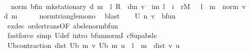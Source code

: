 \begin{isabellebody}
\ \ \isamarkupfalse%
\ \isamarkupfalse%
\ {\isacharasterisk}{\kern0pt}{\isacharcolon}{\kern0pt}\ {\isachardoublequoteopen}norm\ {\isacharparenleft}{\kern0pt}{\isasymnu}\isactrlsub b{\isacharunderscore}{\kern0pt}fin\ {\isacharparenleft}{\kern0pt}mk{\isacharunderscore}{\kern0pt}stationary\ d{\isacharparenright}{\kern0pt}\ m\ {\isacharplus}{\kern0pt}\ {\isacharparenleft}{\kern0pt}{\isacharparenleft}{\kern0pt}l\ {\isacharasterisk}{\kern0pt}\isactrlsub R\ {\isasymP}\ d{\isacharparenright}{\kern0pt}{\isacharcircum}{\kern0pt}{\isacharcircum}{\kern0pt}m{\isacharparenright}{\kern0pt}\ v{\isacharparenright}{\kern0pt}\ {\isasymle}\ {\isacharparenleft}{\kern0pt}{\isasymSum}i{\isacharless}{\kern0pt}m{\isachardot}{\kern0pt}\ l\ {\isacharcircum}{\kern0pt}\ i\ {\isacharasterisk}{\kern0pt}\ r\isactrlsub M{\isacharparenright}{\kern0pt}\ {\isacharplus}{\kern0pt}\ \ l\ {\isacharcircum}{\kern0pt}\ m\ {\isacharasterisk}{\kern0pt}\ norm\ v{\isachardoublequoteclose}\ \ d\ m\isanewline
\ \ \ \ \isamarkupfalse%
\ norm{\isacharunderscore}{\kern0pt}triangle{\isacharunderscore}{\kern0pt}mono\ \isamarkupfalse%
\ blast\isanewline
\ \ \isamarkupfalse%
\ {\isachardoublequoteopen}U\ n\ v\ {\isasymin}\ bfun{\isachardoublequoteclose}\isanewline
\ \ \ \ \isamarkupfalse%
\ ex{\isacharunderscore}{\kern0pt}dec\ order{\isachardot}{\kern0pt}trans{\isacharbrackleft}{\kern0pt}OF\ abs{\isacharunderscore}{\kern0pt}le{\isacharunderscore}{\kern0pt}norm{\isacharunderscore}{\kern0pt}bfun\ {\isacharasterisk}{\kern0pt}{\isacharbrackright}{\kern0pt}\isanewline
\ \ \ \ \isamarkupfalse%
\ {\isacharparenleft}{\kern0pt}fastforce\ simp{\isacharcolon}{\kern0pt}\ U{\isacharunderscore}{\kern0pt}def\ intro{\isacharbang}{\kern0pt}{\isacharcolon}{\kern0pt}\ bfun{\isacharunderscore}{\kern0pt}normI\ cSup{\isacharunderscore}{\kern0pt}abs{\isacharunderscore}{\kern0pt}le{\isacharparenright}{\kern0pt}\isanewline
{}\isamarkupfalse%
%
\endisatagproof
{\isafoldproof}%
%
\isadelimproof
\isanewline
%
\endisadelimproof
\isanewline
{}\isamarkupfalse%
\ U\isactrlsub b{\isacharunderscore}{\kern0pt}contraction{\isacharcolon}{\kern0pt}\ {\isachardoublequoteopen}dist\ {\isacharparenleft}{\kern0pt}U\isactrlsub b\ m\ v{\isacharparenright}{\kern0pt}\ {\isacharparenleft}{\kern0pt}U\isactrlsub b\ m\ u{\isacharparenright}{\kern0pt}\ {\isasymle}\ l\ {\isacharcircum}{\kern0pt}\ m\ {\isacharasterisk}{\kern0pt}\ dist\ v\ u{\isachardoublequoteclose}\isanewline

\end{isabellebody}
